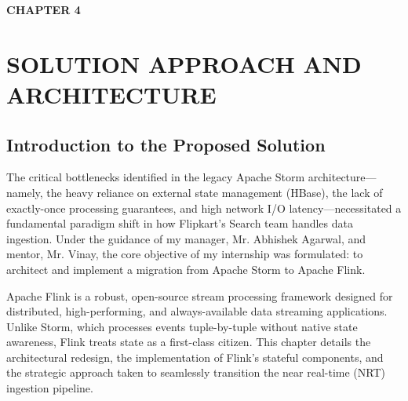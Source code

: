 \newpage
\textbf{\huge CHAPTER  4}\\
\section{SOLUTION APPROACH AND ARCHITECTURE} \setcounter{section}{4}
\subsection{Introduction to the Proposed Solution}\setcounter{subsection}{1}
\begin{justify}
    The critical bottlenecks identified in the legacy Apache Storm architecture—namely, the heavy reliance on external state management (HBase), the lack of exactly-once processing guarantees, and high network I/O latency—necessitated a fundamental paradigm shift in how Flipkart's Search team handles data ingestion. Under the guidance of my manager, Mr. Abhishek Agarwal, and mentor, Mr. Vinay, the core objective of my internship was formulated: to architect and implement a migration from Apache Storm to Apache Flink.

    Apache Flink is a robust, open-source stream processing framework designed for distributed, high-performing, and always-available data streaming applications. Unlike Storm, which processes events tuple-by-tuple without native state awareness, Flink treats state as a first-class citizen. This chapter details the architectural redesign, the implementation of Flink's stateful components, and the strategic approach taken to seamlessly transition the near real-time (NRT) ingestion pipeline.
\end{justify}

\vspace{0.25cm}

